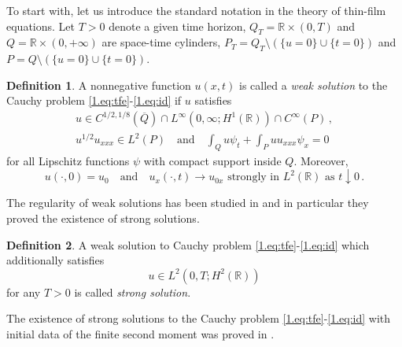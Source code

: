 \documentclass[12pt]{amsart}
\newcommand{\R}{{\mathbb R}}
\theoremstyle{plain}
\theoremstyle{definition}
\newtheorem{definition}{Definition}[section]
\theoremstyle{remark}
\begin{document}
To start with, let us introduce the standard notation in the theory of thin-film equations. Let $T>0$ denote a given time horizon, $Q_T = \R\times(0,T)$ and $Q = \R\times(0,+\infty)$ are space-time cylinders, $P_T = Q_T\setminus \left(\{u=0\}\cup \{t=0\}\right)$ and $P = Q\setminus \left(\{u=0\}\cup \{t=0\}\right)$.
\begin{definition}
A nonnegative function $u(x,t)$ is called a \emph{weak solution} to the Cauchy problem \eqref{1.eq:tfe}-\eqref{1.eq:id} if $u$ satisfies
\begin{align*}
    u\in C^{1/2,1/8}(\overline{Q})\cap L^\infty(0,\infty;H^1(\R))\cap C^\infty(P)\,,\\
    u^{1/2}u_{xxx}\in L^2(P)
    \quad \text{and}\quad\int_Q u\psi_t + \int_P u u_{xxx}\psi_x = 0
\end{align*}
for all Lipschitz functions $\psi$ with compact support inside $Q$. Moreover, 
\begin{equation*}
    u(\cdot,0) = u_0\quad\text{and}\quad u_x(\cdot,t)\to u_{0x} \text{ strongly in }L^2(\R) \text{ as }t\downarrow 0\,.
\end{equation*}
\end{definition}
\noindent The regularity of weak solutions has been studied in \cite{BBD95, BePu96} and in particular they proved the existence of strong solutions.
\begin{definition}
A weak solution to Cauchy problem \eqref{1.eq:tfe}-\eqref{1.eq:id} which additionally satisfies 
\begin{equation*}
    u\in L^2(0,T;H^2(\R))
\end{equation*}
for any $T>0$ is called \emph{strong solution}.
\end{definition}
\noindent The existence of strong solutions to the Cauchy problem \eqref{1.eq:tfe}-\eqref{1.eq:id} with initial data of the finite second moment was proved in \cite{CaTo02}.  

\end{document}
